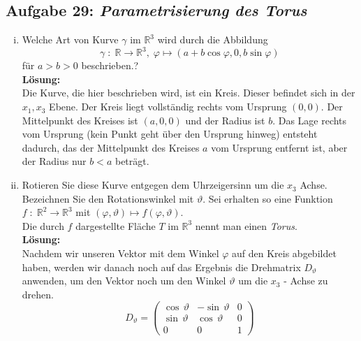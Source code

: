 \subsection*{Aufgabe 29: \mdseries\itshape Parametrisierung des Torus}

\begin{enumerate}[(i)]
	\item Welche Art von Kurve $\gamma$ im $\mathbb{R}^3$ wird durch die Abbildung
	$$
		\gamma \; : \; \mathbb{R} \rightarrow \mathbb{R}^3, \; \varphi \mapsto (a + b\cos \varphi,0,b\sin\varphi)
	$$
	für $a>b>0$ beschrieben.?\\

	\textbf{Lösung:}\\
		Die Kurve, die hier beschrieben wird, ist ein Kreis. Dieser befindet sich in der $x_1,x_3$ Ebene. Der Kreis
		liegt vollständig rechts vom Ursprung $(0,0)$. Der Mittelpunkt des Kreises ist $(a,0,0)$ und der Radius ist
		$b$. Das Lage rechts vom Ursprung (kein Punkt geht über den Ursprung hinweg) entsteht dadurch, das der Mittelpunkt des Kreises $a$ vom Ursprung entfernt ist,
		aber der Radius nur $b<a$ beträgt.

	\item Rotieren Sie diese Kurve entgegen dem Uhrzeigersinn um die $x_3$ Achse. Bezeichnen Sie den Rotationswinkel
	mit $\vartheta$. Sei erhalten so eine Funktion $f \; : \; \mathbb{R}^2 \rightarrow \mathbb{R}^3$ mit
	$(\varphi,\vartheta) \mapsto f (\varphi, \vartheta)$.\\

	Die durch $f$ dargestellte Fläche $T$ im $\mathbb{R}^3$ nennt man einen \emph{Torus}.\\

	\textbf{Lösung:}\\
		Nachdem wir unseren Vektor mit dem Winkel $\varphi$ auf den Kreis abgebildet haben, werden wir danach
		noch auf das Ergebnis die Drehmatrix $D_\vartheta$ anwenden, um den Vektor noch um den Winkel $\vartheta$ um
		die $x_3$ - Achse zu drehen.\\

		$$
			D_\vartheta = \begin{pmatrix}
				\cos \, \vartheta & - \sin \, \vartheta & 0\\
				\sin \, \vartheta & \cos \, \vartheta  & 0\\
				0 & 0 & 1
			\end{pmatrix}
		$$


\end{enumerate}
